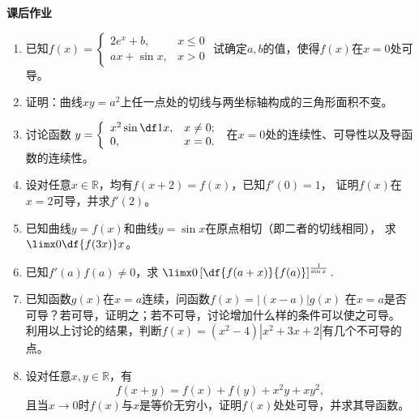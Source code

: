 \begin{ext}
	{\centering\bf 课后作业}
	
	\begin{enumerate}  
	  \item 已知$f(x)=\left\{\begin{array}{ll}
		2e^x+b,& x\leq0\\ ax+\sin x,& x> 0
		\end{array}\right.$
		试确定$a,b$的值，使得$f(x)$在$x=0$处可导。
	  \item 证明：曲线$xy=a^2$上任一点处的切线与两坐标轴构成的三角形面积不变。
	  \item 讨论函数
	  	$y=\left\{\begin{array}{ll}
	    	x^2\sin\df1x,& x\ne0;\\ 0, & x=0.
	    \end{array}\right.$
	  在$x=0$处的连续性、可导性以及导函数的连续性。
	  \item 设对任意$x\in\mathbb{R}$，均有$f(x+2)=f(x)$，已知$f'(0)=1$，
	  证明$f(x)$在$x=2$可导，并求$f'(2)$。
	  \item 已知曲线$y=f(x)$和曲线$y=\sin x$在原点相切（即二者的切线相同），
	  求$\limx0\df{f(3x)}x$。
	  \item 已知$f'(a)f(a)\ne 0$，求
	  $\limx0\left[\df{f(a+x)}{f(a)}\right]^{\frac1{\sin x}}.$
	  \item 已知函数$g(x)$在$x=a$连续，问函数$f(x)=|(x-a)|g(x)$
	  在$x=a$是否可导？若可导，证明之；若不可导，讨论增加什么样的条件可以使之可导。
	  利用以上讨论的结果，判断$f(x)=(x^2-4)|x^2+3x+2|$有几个不可导的点。
	  \item 设对任意$x,y\in\mathbb{R}$，有
	  $$f(x+y)=f(x)+f(y)+x^2y+xy^2,$$
	  且当$x\to0$时$f(x)$与$x$是等价无穷小，证明$f(x)$处处可导，并求其导函数。
	\end{enumerate}
\end{ext}

